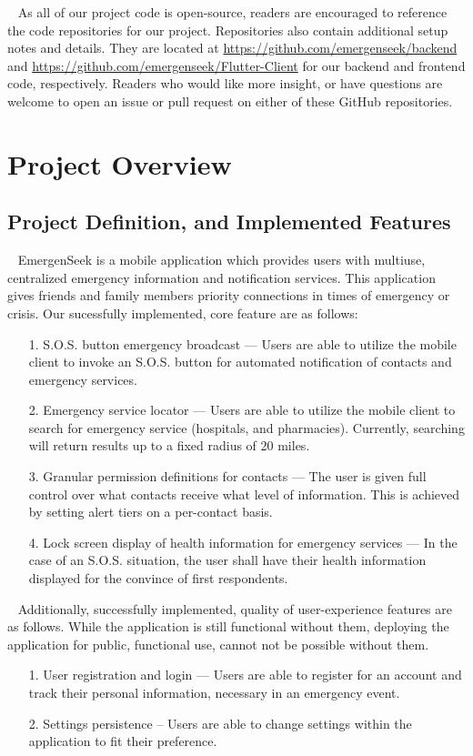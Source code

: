 \documentclass[10pt, a4paper]{article}
\begin{document}
\par ~ As all of our project code is open-source, readers are encouraged to reference the code repositories for our project. Repositories also contain additional setup notes and details. They are located at \url{https://github.com/emergenseek/backend} and \url{https://github.com/emergenseek/Flutter-Client} for our backend and frontend code, respectively. Readers who would like more insight, or have questions are welcome to open an issue or pull request on either of these GitHub repositories.

\section{Project Overview}
\subsection{Project Definition, and Implemented Features}
\par ~ EmergenSeek is a mobile application which provides users with multiuse, centralized emergency information and notification services. This application gives friends and family members priority connections in times of emergency or crisis. Our sucessfully implemented, core feature are as follows:

\begin{enumerate}
	\item[1.] S.O.S. button emergency broadcast --- Users are able to utilize the mobile client to invoke an S.O.S. button for automated notification of contacts and emergency services. 
	\item[2.] Emergency service locator --- Users are able to utilize the mobile client to search for emergency service (hospitals, and pharmacies). Currently, searching will return results up to a fixed radius of 20 miles.
	\item[3.] Granular permission definitions for contacts --- The user is given full control over what contacts receive what level of information. This is achieved by setting alert tiers on a per-contact basis.
	\item[4.] Lock screen display of health information for emergency services --- In the case of an S.O.S. situation, the user shall have their health information displayed for the convince of first respondents.
\end{enumerate}

\par ~ Additionally, successfully implemented, quality of user-experience features are as follows. While the application is still functional without them, deploying the application for public, functional use, cannot not be possible without them.
\begin{enumerate}
	\item[1.] User registration and login --- Users are able to register for an account and track their personal information, necessary in an emergency event.
	\item[2.] Settings persistence -- Users are able to change settings within the application to fit their preference.
\end{enumerate}
\end{document}
